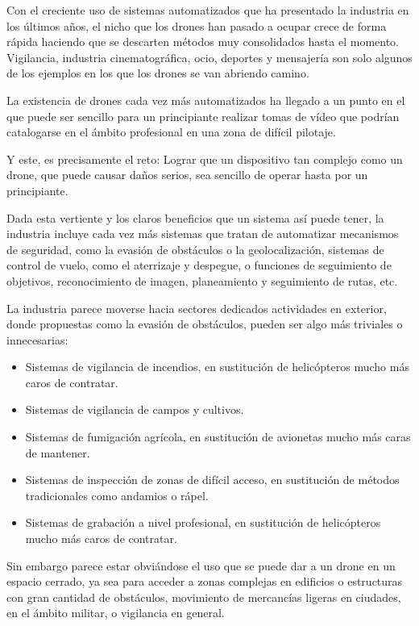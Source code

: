 

Con el creciente uso de sistemas automatizados que ha presentado la industria en los últimos años, el nicho que los drones han pasado a ocupar crece de forma rápida haciendo que se descarten métodos muy consolidados hasta el momento. 
Vigilancia, industria cinematográfica, ocio, deportes y mensajería son solo algunos de los ejemplos en los que los drones se van abriendo camino. 

La existencia de drones cada vez más automatizados ha llegado a un punto en el que puede ser sencillo para un principiante realizar tomas de vídeo que podrían catalogarse en el ámbito profesional en una zona de difícil pilotaje.

Y este, es precisamente el reto: Lograr que un dispositivo tan complejo como un drone, que puede causar daños serios, sea sencillo de operar hasta por un principiante. 

Dada esta vertiente y los claros beneficios que un sistema así puede tener, la industria incluye cada vez más sistemas que tratan de automatizar mecanismos de seguridad, como la evasión de obstáculos o la geolocalización, sistemas de control de vuelo, como el aterrizaje y despegue, o funciones de seguimiento de objetivos, reconocimiento de imagen, planeamiento y seguimiento de rutas, etc. 

La industria parece moverse hacia sectores dedicados actividades en exterior, donde propuestas como la evasión de obstáculos, pueden ser algo más triviales o innecesarias:

\begin{itemize}
\item Sistemas de vigilancia de incendios, en sustitución de helicópteros mucho más caros de contratar.
\item Sistemas de vigilancia de campos y cultivos.
\item Sistemas de fumigación agrícola, en sustitución de avionetas mucho más caras de mantener.
\item Sistemas de inspección de zonas de difícil acceso, en sustitución de métodos tradicionales como andamios o rápel.
\item Sistemas de grabación a nivel profesional, en sustitución de helicópteros mucho más caros de contratar.
\end{itemize}

Sin embargo parece estar obviándose el uso que se puede dar a un drone en un espacio cerrado, ya sea para acceder a zonas complejas en edificios o estructuras con gran cantidad de obstáculos, movimiento de mercancías ligeras en ciudades, en el ámbito militar, o vigilancia en general.


